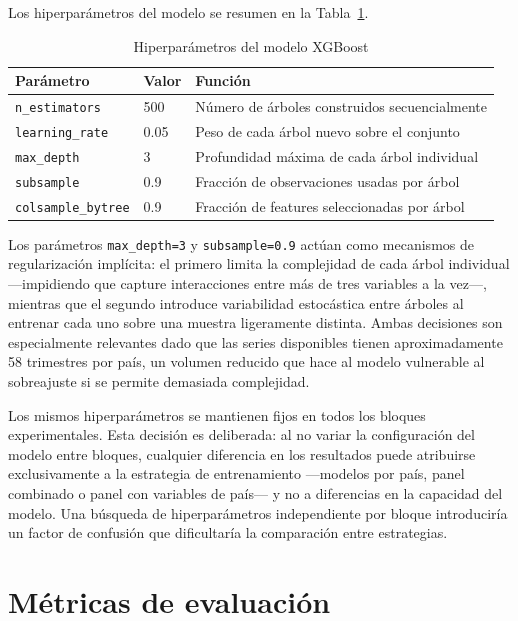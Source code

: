 Los hiperparámetros del modelo se resumen en la Tabla~\ref{tab:xgb_params}.

\begin{table}[H]
\centering
\caption{Hiperparámetros del modelo XGBoost}
\label{tab:xgb_params}
\small
\begin{tabular}{lll}
\hline
\textbf{Parámetro} & \textbf{Valor} & \textbf{Función} \\
\hline
\texttt{n\_estimators}    & 500  & Número de árboles construidos secuencialmente \\
\texttt{learning\_rate}   & 0.05 & Peso de cada árbol nuevo sobre el conjunto \\
\texttt{max\_depth}       & 3    & Profundidad máxima de cada árbol individual \\
\texttt{subsample}        & 0.9  & Fracción de observaciones usadas por árbol \\
\texttt{colsample\_bytree}& 0.9  & Fracción de features seleccionadas por árbol \\
\hline
\end{tabular}
\end{table}

Los parámetros \texttt{max\_depth=3} y \texttt{subsample=0.9} actúan como mecanismos de
regularización implícita: el primero limita la complejidad de cada árbol individual
---impidiendo que capture interacciones entre más de tres variables a la vez---, mientras
que el segundo introduce variabilidad estocástica entre árboles al entrenar cada uno
sobre una muestra ligeramente distinta. Ambas decisiones son especialmente relevantes
dado que las series disponibles tienen aproximadamente 58 trimestres por país, un volumen
reducido que hace al modelo vulnerable al sobreajuste si se permite demasiada complejidad.

Los mismos hiperparámetros se mantienen fijos en todos los bloques experimentales. Esta
decisión es deliberada: al no variar la configuración del modelo entre bloques, cualquier
diferencia en los resultados puede atribuirse exclusivamente a la estrategia de
entrenamiento ---modelos por país, panel combinado o panel con variables de país---
y no a diferencias en la capacidad del modelo. Una búsqueda de hiperparámetros
independiente por bloque introduciría un factor de confusión que dificultaría la
comparación entre estrategias.

\section{Métricas de evaluación}

